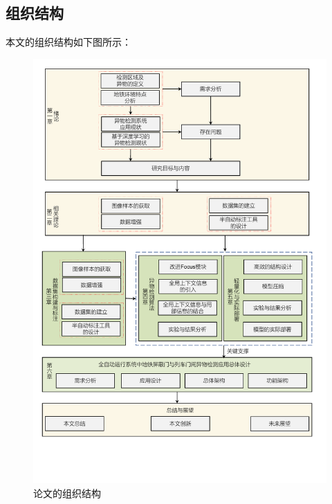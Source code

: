 \subsection{组织结构}
本文的组织结构如下图所示：
\begin{figure}[htbp]
	\centering
	\includegraphics[scale=0.8]{Fig/文章框架.pdf}
	\caption{\label{论文的组织结构}论文的组织结构}
\end{figure}